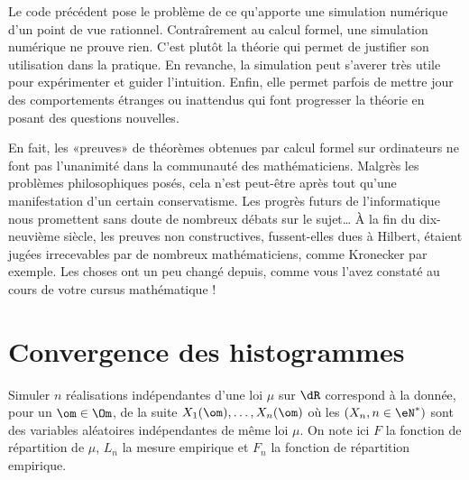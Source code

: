 %
\begin{rem}
  Le code précédent pose le problème de ce qu'apporte une simulation numérique
  d'un point de vue rationnel. Contraîrement au calcul formel, une simulation
  numérique ne prouve rien. C'est plutôt la théorie qui permet de justifier
  son utilisation dans la pratique. En revanche, la simulation peut s'averer
  très utile pour expérimenter et guider l'intuition. Enfin, elle permet
  parfois de mettre jour des comportements étranges ou inattendus qui font
  progresser la théorie en posant des questions nouvelles.
  
  En fait, les «preuves» de théorèmes obtenues par calcul formel sur
  ordinateurs ne font pas l'unanimité dans la communauté des mathématiciens.
  Malgrès les problèmes philosophiques posés, cela n'est peut-être après tout
  qu'une manifestation d'un certain conservatisme. Les progrès futurs de
  l'informatique nous promettent sans doute de nombreux débats sur le
  sujet\ldots{} À la fin du dix-neuvième siècle, les preuves non
  constructives, fussent-elles dues à Hilbert, étaient jugées irrecevables par
  de nombreux mathématiciens, comme Kronecker par exemple. Les choses ont un
  peu changé depuis, comme vous l'avez constaté au cours de votre cursus
  mathématique !
\end{rem}


%
\section{Convergence des histogrammes}
%

Simuler $n$ réalisations indépendantes d'une loi $\mu$ sur $\dR$ correspond à la
donnée, pour un $\om\in\Om$, de la suite $X_1(\om),\ldots,X_n(\om)$ où les $(X_n,
n\in\eN^*)$ sont des variables aléatoires indépendantes de même loi $\mu$. On note
ici $F$ la fonction de répartition de $\mu$, $L_n$ la mesure empirique et $F_n$
la fonction de répartition empirique.

